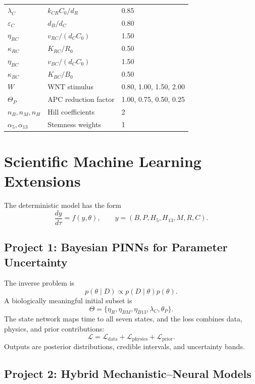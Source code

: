\documentclass[11pt]{article}
\begin{document}
\begin{longtable}{lll}
\(\lambda_C\) & \(k_{CR}C_0/d_R\) & 0.85\\
\(\varepsilon_C\) & \(d_B/d_C\) & 0.80\\
\(\eta_{RC}\) & \(v_{RC}/(d_CC_0)\) & 1.50\\
\(\kappa_{RC}\) & \(K_{RC}/R_0\) & 0.50\\
\(\eta_{BC}\) & \(v_{BC}/(d_CC_0)\) & 1.50\\
\(\kappa_{BC}\) & \(K_{BC}/B_0\) & 0.50\\
\(W\) & WNT stimulus & 0.80, 1.00, 1.50, 2.00\\
\(\Theta_P\) & APC reduction factor & 1.00, 0.75, 0.50, 0.25\\
\(n_B,n_M,n_H\) & Hill coefficients & 2\\
\(\alpha_5,\alpha_{13}\) & Stemness weights & 1\\
\end{longtable}

\section{Scientific Machine Learning Extensions}

The deterministic model has the form
\[
\frac{dy}{d\tau}=f(y,\theta),
\qquad
y=(B,P,H_5,H_{13},M,R,C).
\]

\subsection{Project 1: Bayesian PINNs for Parameter Uncertainty}

The inverse problem is
\[
p(\theta\mid D)\propto p(D\mid\theta)p(\theta).
\]
A biologically meaningful initial subset is
\[
\Theta=\{\eta_R,\eta_{BM},\eta_{B13},\lambda_C,\theta_P\}.
\]
The state network maps time to all seven states, and the loss combines data,
physics, and prior contributions:
\[
\mathcal L=\mathcal L_{\mathrm{data}}
+\mathcal L_{\mathrm{physics}}+\mathcal L_{\mathrm{prior}}.
\]
Outputs are posterior distributions, credible intervals, and uncertainty
bands.

\subsection{Project 2: Hybrid Mechanistic--Neural Models}
\end{document}
